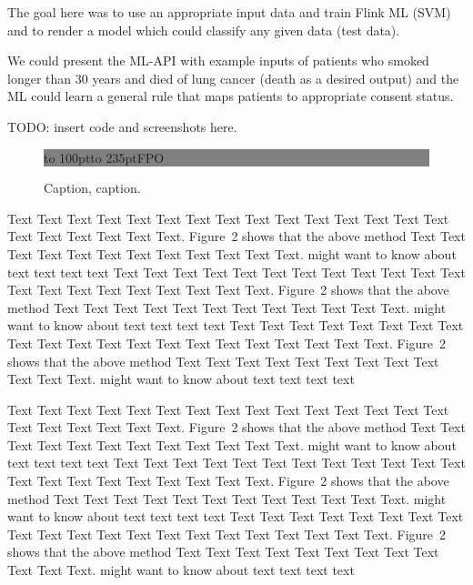 \documentclass{bioinfo}
\begin{document}
\begin{methods}
The goal here was to use an appropriate input data and train Flink ML (SVM) and to render a model which could classify any given data (test data).

We could present the ML-API with example inputs of patients who smoked longer than 30 years and died of lung cancer (death as a desired output) and the ML could learn a general rule that maps patients to appropriate consent status.

TODO: insert code and screenshots here.



\end{methods}

\begin{figure}[!tpb]%
\fboxsep=0pt\colorbox{gray}{\begin{minipage}[t]{235pt} \vbox to 100pt{\vfill\hbox to
235pt{\hfill\fontsize{24pt}{24pt}\selectfont FPO\hfill}\vfill}
\end{minipage}}
\caption{Caption, caption.}\label{fig:01}
\end{figure}


Text Text Text Text Text Text  Text Text Text Text Text Text Text
Text Text  Text Text Text Text Text Text.
Figure~2\vphantom{\ref{fig:02}} shows that the above method  Text
Text Text Text  Text Text Text Text Text Text  Text Text.
\citealp{Boffelli03} might want to know about  text text text text
Text Text Text Text Text Text  Text Text Text Text Text Text Text
Text Text  Text Text Text Text Text Text.
Figure~2\vphantom{\ref{fig:02}} shows that the above method  Text
Text Text Text  Text Text Text Text Text Text  Text Text.
\citealp{Boffelli03} might want to know about  text text text text
Text Text Text Text Text Text Text Text Text Text Text Text Text
Text Text  Text Text Text Text Text Text.
Figure~2\vphantom{\ref{fig:02}} shows that the above method  Text
Text Text Text  Text Text Text Text Text Text  Text Text.
\citealp{Boffelli03} might want to know about  text text text text


Text Text Text Text Text Text  Text Text Text Text Text Text Text
Text Text  Text Text Text Text Text Text.
Figure~2\vphantom{\ref{fig:02}} shows that the above method  Text
Text Text Text  Text Text Text Text Text Text  Text Text.
\citealp{Boffelli03} might want to know about  text text text text
Text Text Text Text Text Text  Text Text Text Text Text Text Text
Text Text  Text Text Text Text Text Text.
Figure~2\vphantom{\ref{fig:02}} shows that the above method  Text
Text Text Text  Text Text Text Text Text Text  Text Text.
\citealp{Boffelli03} might want to know about  text text text text
Text Text Text Text Text Text Text Text Text Text Text Text Text
Text Text  Text Text Text Text Text Text.
Figure~2\vphantom{\ref{fig:02}} shows that the above method  Text
Text Text Text  Text Text Text Text Text Text  Text Text.
\citealp{Boffelli03} might want to know about  text text text text
\end{document}
